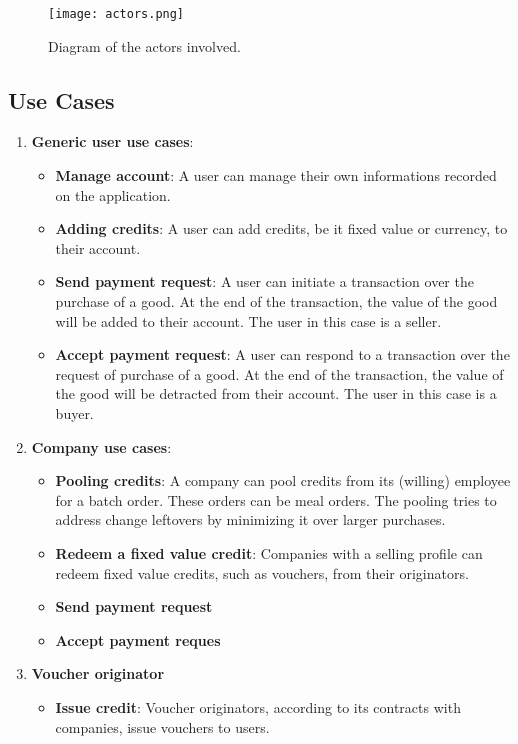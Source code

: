 \begin{figure}[h]
    \centering
    \texttt{[image: actors.png]}
    \caption{
       Diagram of the actors involved. 
        }
\end{figure}

\subsection{Use Cases}
\begin{enumerate}
    \item \textbf{Generic user use cases}: 
        \begin{itemize}
            \item \textbf{Manage account}: A user can manage their own informations recorded on the application.
            \item \textbf{Adding credits}: A user can add credits, be it fixed value or currency, to their account.
            \item \textbf{Send payment request}: A user can initiate a transaction over the purchase of a good. At the end of the transaction, the value of the good will be added to their account. The user in this case is a seller.
            \item \textbf{Accept payment request}: A user can respond to a transaction over the request of purchase of a good. At the end of the transaction, the value of the good will be detracted from their account. The user in this case is a buyer.
        \end{itemize}
    \item \textbf{Company use cases}: 
        \begin{itemize}
            \item \textbf{Pooling credits}: A company can pool credits from its (willing) employee for a batch order. These orders can be meal orders. The pooling tries to address change leftovers by minimizing it over larger purchases.
            \item \textbf{Redeem a fixed value credit}: Companies with a selling profile can redeem fixed value credits, such as vouchers, from their originators.
            \item \textbf{Send payment request}
            \item \textbf{Accept payment reques}
        \end{itemize}
    \item \textbf{Voucher originator}
        \begin{itemize}
            \item \textbf{Issue credit}: Voucher originators, according to its contracts with companies, issue vouchers to users.
        \end{itemize}
\end{enumerate}

